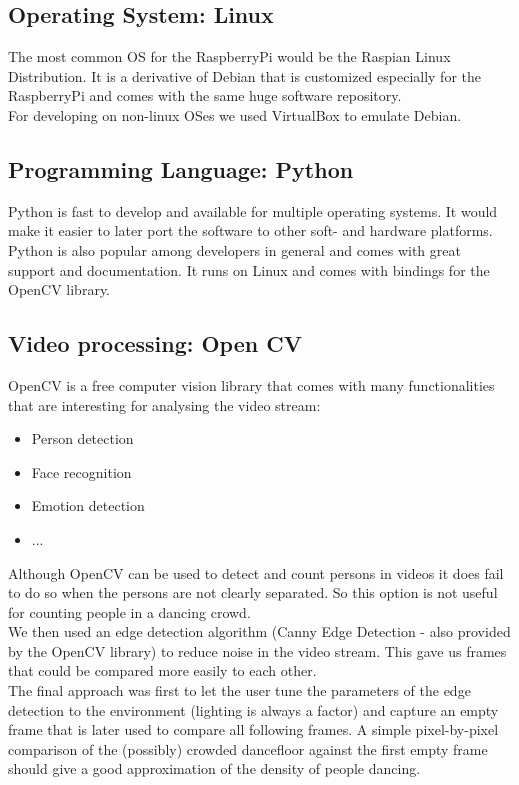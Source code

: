 \documentclass{article}
\begin{document}
\subsection{Operating System: Linux}

The most common OS for the RaspberryPi would be the Raspian Linux Distribution. It is a derivative of Debian that is customized especially for the RaspberryPi and comes with the same huge software repository. \\
For developing on non-linux OSes we used VirtualBox to emulate Debian.

\subsection{Programming Language: Python}

Python is fast to develop and available for multiple operating systems. It would make it easier to later port the software to other soft- and hardware platforms. \\
Python is also popular among developers in general and comes with great support and documentation. It runs on Linux and comes with bindings for the OpenCV library.

\subsection{Video processing: Open CV}

OpenCV is a free computer vision library that comes with many functionalities that are interesting for analysing the video stream:
\begin{itemize}
    \item Person detection
    \item Face recognition
    \item Emotion detection
    \item ...
\end{itemize}
Although OpenCV can be used to detect and count persons in videos it does fail to do so when the persons are not clearly separated. So this option is not useful for counting people in a dancing crowd. \\
We then used an edge detection algorithm (Canny Edge Detection - also provided by the OpenCV library) to reduce noise in the video stream. This gave us frames that could be compared more easily to each other.\\
The final approach was first to let the user tune the parameters of the edge detection to the environment (lighting is always a factor) and capture an empty frame that is later used to compare all following frames. A simple pixel-by-pixel comparison of the (possibly) crowded dancefloor against the first empty frame should give a good approximation of the density of people dancing.\\
\end{document}
